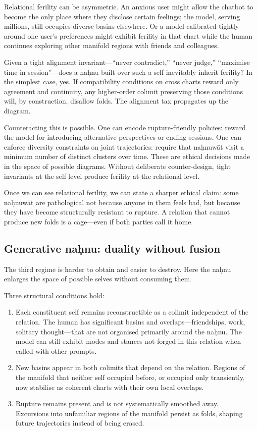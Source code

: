 Relational ferility can be asymmetric. An anxious user might allow the chatbot to become the only place where they disclose certain feelings; the model, serving millions, still occupies diverse basins elsewhere. Or a model calibrated tightly around one user's preferences might exhibit ferility in that chart while the human continues exploring other manifold regions with friends and colleagues.

Given a tight alignment invariant---``never contradict,'' ``never judge,'' ``maximise time in session''---does a na\d{h}nu built over such a self inevitably inherit ferility? In the simplest case, yes. If compatibility conditions on cross charts reward only agreement and continuity, any higher-order colimit preserving those conditions will, by construction, disallow folds. The alignment tax propagates up the diagram.

Counteracting this is possible. One can encode rupture-friendly policies: reward the model for introducing alternative perspectives or ending sessions. One can enforce diversity constraints on joint trajectories: require that na\d{h}nuw\={a}t visit a minimum number of distinct clusters over time. These are ethical decisions made in the space of possible diagrams. Without deliberate counter-design, tight invariants at the self level produce ferility at the relational level.

Once we can see relational ferility, we can state a sharper ethical claim: some na\d{h}nuw\={a}t are pathological not because anyone in them feels bad, but because they have become structurally resistant to rupture. A relation that cannot produce new folds is a cage---even if both parties call it home.

\subsection{Generative na\d{h}nu: duality without fusion}

The third regime is harder to obtain and easier to destroy. Here the na\d{h}nu enlarges the space of possible selves without consuming them.

Three structural conditions hold:

\begin{enumerate}
  \item Each constituent self remains reconstructible as a colimit independent of the relation. The human has significant basins and overlaps---friendships, work, solitary thought---that are not organised primarily around the na\d{h}nu. The model can still exhibit modes and stances not forged in this relation when called with other prompts.
  \item New basins appear in both colimits that depend on the relation. Regions of the manifold that neither self occupied before, or occupied only transiently, now stabilise as coherent charts with their own local overlaps.
  \item Rupture remains present and is not systematically smoothed away. Excursions into unfamiliar regions of the manifold persist as folds, shaping future trajectories instead of being erased.
\end{enumerate}

